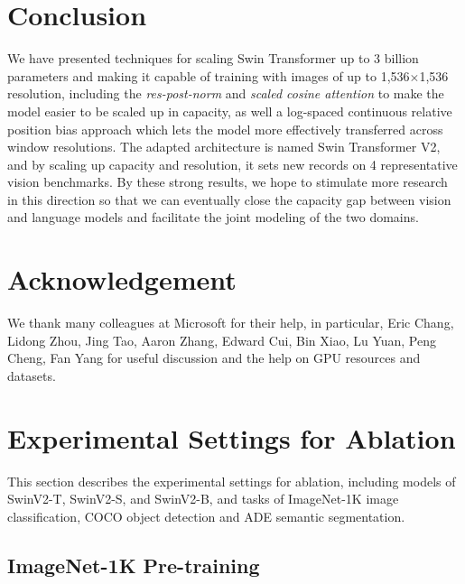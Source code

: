 \documentclass[10pt,twocolumn,letterpaper]{article}
\begin{document}
\section{Conclusion}

We have presented techniques for scaling Swin Transformer up to 3 billion parameters and making it capable of training with images of up to 1,536$\times$1,536 resolution, including the \emph{res-post-norm} and \emph{scaled cosine attention} to make the model easier to be scaled up in capacity, as well a log-spaced continuous relative position bias approach which lets the model more effectively transferred across window resolutions. The adapted architecture is named Swin Transformer V2, and by scaling up capacity and resolution, it sets new records on 4 representative vision benchmarks. By these strong results, we hope to stimulate more research in this direction so that we can eventually close the capacity gap between vision and language models and facilitate the joint modeling of the two domains.

\section*{Acknowledgement}

We thank many colleagues at Microsoft for their help, in particular, Eric Chang, Lidong Zhou, Jing Tao, Aaron Zhang, Edward Cui, Bin Xiao, Lu Yuan, Peng Cheng, Fan Yang for useful discussion and the help on GPU resources and datasets.


\renewcommand{\thesection}{A\arabic{section}}
\setcounter{section}{0}

\section{Experimental Settings for Ablation}

This section describes the experimental settings for ablation, including models of SwinV2-T, SwinV2-S, and SwinV2-B, and tasks of ImageNet-1K image classification, COCO object detection and ADE semantic segmentation. 

\subsection{ImageNet-1K Pre-training}
\end{document}
